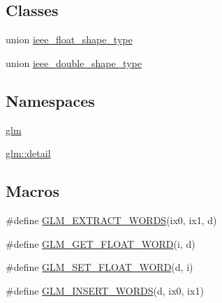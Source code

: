\subsection*{Classes}
\begin{DoxyCompactItemize}
\item 
union \hyperlink{unionieee__float__shape__type}{ieee\+\_\+float\+\_\+shape\+\_\+type}
\item 
union \hyperlink{unionieee__double__shape__type}{ieee\+\_\+double\+\_\+shape\+\_\+type}
\end{DoxyCompactItemize}
\subsection*{Namespaces}
\begin{DoxyCompactItemize}
\item 
 \hyperlink{namespaceglm}{glm}
\item 
 \hyperlink{namespaceglm_1_1detail}{glm\+::detail}
\end{DoxyCompactItemize}
\subsection*{Macros}
\begin{DoxyCompactItemize}
\item 
\#define \hyperlink{ulp_8inl_a037d712bb7eec79dcd0073eb07d3f3e8}{G\+L\+M\+\_\+\+E\+X\+T\+R\+A\+C\+T\+\_\+\+W\+O\+R\+DS}(ix0,  ix1,  d)
\item 
\#define \hyperlink{ulp_8inl_a28d9056369280955e923f99180ccb23c}{G\+L\+M\+\_\+\+G\+E\+T\+\_\+\+F\+L\+O\+A\+T\+\_\+\+W\+O\+RD}(i,  d)
\item 
\#define \hyperlink{ulp_8inl_ab01ab8df0632f4a5f05e00f570e6b873}{G\+L\+M\+\_\+\+S\+E\+T\+\_\+\+F\+L\+O\+A\+T\+\_\+\+W\+O\+RD}(d,  i)
\item 
\#define \hyperlink{ulp_8inl_ac4ec14cb5c94f0ca1d594457ee17636f}{G\+L\+M\+\_\+\+I\+N\+S\+E\+R\+T\+\_\+\+W\+O\+R\+DS}(d,  ix0,  ix1)
\end{DoxyCompactItemize}

